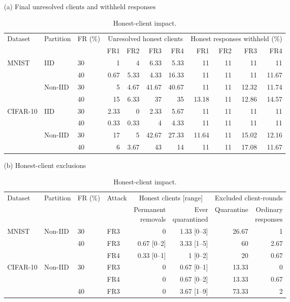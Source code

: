 \begin{table}[!tp]
\centering\footnotesize\setlength{\tabcolsep}{5pt}
\caption{Honest-client impact.}\label{tab:safety}
(a) Final unresolved clients and withheld responses\par\smallskip
\begin{tabular}{lllrrrrrrrr}
\toprule
\multirow{2}{*}{Dataset} & \multirow{2}{*}{Partition} & \multirow{2}{*}{FR (\%)} & \multicolumn{4}{c}{Unresolved honest clients} & \multicolumn{4}{c}{Honest responses withheld (\%)} \\
\cmidrule(lr){4-7}\cmidrule(lr){8-11}
& & & FR1 & FR2 & FR3 & FR4 & FR1 & FR2 & FR3 & FR4 \\
\midrule
\multirow{4}{*}{MNIST} & \multirow{2}{*}{IID} & 30 & 1 & 4 & 6.33 & 5.33 & 11 & 11 & 11 & 11 \\
 &  & 40 & 0.67 & 5.33 & 4.33 & 16.33 & 11 & 11 & 11 & 11.67 \\
\cmidrule(lr){2-11}
 & \multirow{2}{*}{Non-IID} & 30 & 5 & 4.67 & 41.67 & 40.67 & 11 & 11 & 12.32 & 11.74 \\
 &  & 40 & 15 & 6.33 & 37 & 35 & 13.18 & 11 & 12.86 & 14.57 \\
\midrule
\multirow{4}{*}{CIFAR-10} & \multirow{2}{*}{IID} & 30 & 2.33 & 0 & 2.33 & 5.67 & 11 & 11 & 11 & 11 \\
 &  & 40 & 0.33 & 0.33 & 4 & 4.33 & 11 & 11 & 11 & 11 \\
\cmidrule(lr){2-11}
 & \multirow{2}{*}{Non-IID} & 30 & 17 & 5 & 42.67 & 27.33 & 11.64 & 11 & 15.02 & 12.16 \\
 &  & 40 & 6 & 3.67 & 43 & 14 & 11 & 11 & 17.08 & 11.67 \\
\bottomrule
\end{tabular}
\par\medskip
(b) Honest-client exclusions\par\smallskip
\begin{tabular}{llllrrrr}
\toprule
\multirow{2}{*}{Dataset} & \multirow{2}{*}{Partition} & \multirow{2}{*}{FR (\%)} & \multirow{2}{*}{Attack} & \multicolumn{2}{c}{Honest clients [range]} & \multicolumn{2}{c}{Excluded client-rounds} \\
\cmidrule(lr){5-6}\cmidrule(lr){7-8}
& & & & \shortstack{Permanent\\removals} & \shortstack{Ever\\quarantined} & Quarantine & \shortstack{Ordinary\\responses} \\
\midrule
\multirow{3}{*}{MNIST} & \multirow{3}{*}{Non-IID} & 30 & FR3 & 0 & 1.33 [0--3] & 26.67 & 1 \\
\cmidrule(lr){3-8}
 &  & \multirow{2}{*}{40} & FR3 & 0.67 [0--2] & 3.33 [1--5] & 60 & 2.67 \\
 &  &  & FR4 & 0.33 [0--1] & 1 [0--2] & 20 & 0.67 \\
\midrule
\multirow{3}{*}{CIFAR-10} & \multirow{3}{*}{Non-IID} & \multirow{2}{*}{30} & FR3 & 0 & 0.67 [0--1] & 13.33 & 0 \\
 &  &  & FR4 & 0 & 0.67 [0--2] & 13.33 & 0.67 \\
\cmidrule(lr){3-8}
 &  & 40 & FR3 & 0 & 3.67 [1--9] & 73.33 & 2 \\
\bottomrule
\end{tabular}
\end{table}
